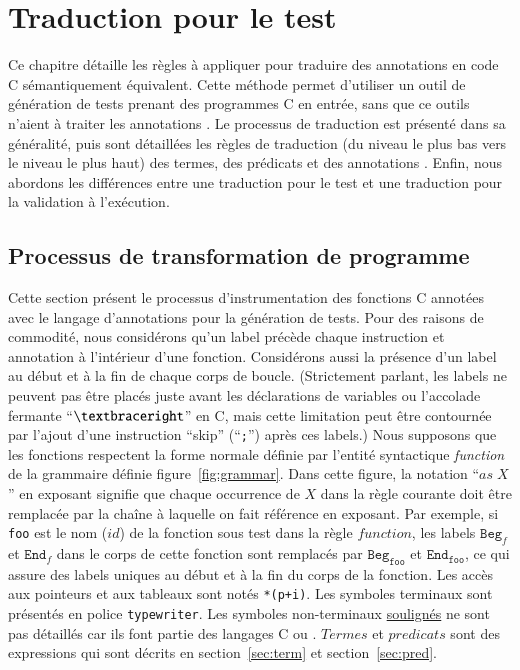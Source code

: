 
\chapter{Traduction pour le test}
\label{sec:traduction}

\chapterintro


Ce chapitre détaille les règles à appliquer pour traduire des annotations \eacsl
en code C sémantiquement équivalent.
Cette méthode permet d'utiliser un outil de génération de tests prenant des
programmes C en entrée, sans que ce outils n'aient à traiter les annotations
\eacsl.
Le processus de traduction est présenté dans sa généralité, puis sont détaillées
les règles de traduction (du niveau le plus bas vers le niveau le plus haut) des
termes, des prédicats et des annotations \eacsl.
Enfin, nous abordons les différences entre une traduction pour le test et une
traduction pour la validation à l'exécution.


\section{Processus de transformation de programme}




Cette section présent le processus d'instrumentation des fonctions C annotées
avec le langage d'annotations \eacsl pour la génération de tests.
Pour des raisons de commodité, nous considérons qu'un label précède chaque
instruction et annotation à l'intérieur d'une fonction.
Considérons aussi la présence d'un label au début et à la fin de chaque corps de
boucle.
(Strictement parlant, les labels ne peuvent pas être placés juste avant les
déclarations de variables ou l'accolade fermante ``$\bclose$'' en C, mais
cette limitation peut être contournée par l'ajout d'une instruction ``skip''
(``\lstinline{;}'') après ces labels.)
Nous supposons que les fonctions respectent la forme normale définie par
l'entité syntactique \textit{function} de la grammaire définie
figure~\ref{fig:grammar}. 
Dans cette figure, la notation ``${\textit{as}\;X}$'' en exposant signifie que
chaque occurrence de $X$ dans la règle courante doit être remplacée par la
chaîne à laquelle on fait référence en exposant.
Par exemple, si \texttt{foo} est le nom ($id$) de la fonction sous test dans la
règle $function$, les labels $\texttt{Beg}_f$ et $\texttt{End}_f$ dans le corps
de cette fonction sont remplacés par $\texttt{Beg}_{\texttt{foo}}$ et
$\texttt{End}_{\texttt{foo}}$, ce qui assure des labels uniques au début et à la
fin du corps de la fonction.
Les accès aux pointeurs et aux tableaux sont notés \lstinline|*(p+i)|.
Les symboles terminaux sont présentés en police \texttt{typewriter}.
Les symboles non-terminaux \underline{soulignés} ne sont pas détaillés car ils
font partie des langages C ou \eacsl.
$Termes$ et $predicats$ sont des expressions \eacsl qui sont décrits en
section~\ref{sec:term} et section~\ref{sec:pred}.


